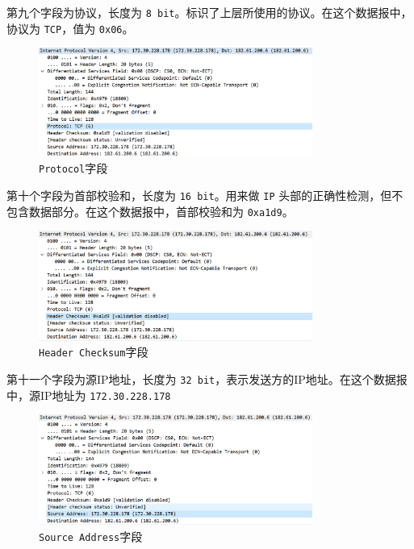 \documentclass{article}
\begin{document}
第九个字段为协议，长度为 \texttt{8 bit}。标识了上层所使用的协议。在这个数据报中，协议为 \texttt{TCP}，值为 \texttt{0x06}。

\begin{figure}[H]
  \centering
  \includegraphics[width=0.8\textwidth]{img/17.png}
  \caption{\texttt{Protocol}字段}
  \label{fig:16}
\end{figure}

第十个字段为首部校验和，长度为 \texttt{16 bit}。用来做 \texttt{IP} 头部的正确性检测，但不包含数据部分。在这个数据报中，首部校验和为 \texttt{0xa1d9}。

\begin{figure}[H]
  \centering
  \includegraphics[width=0.8\textwidth]{img/18.png}
  \caption{\texttt{Header Checksum}字段}
  \label{fig:17}
\end{figure}

第十一个字段为源IP地址，长度为 \texttt{32 bit}，表示发送方的IP地址。在这个数据报中，源IP地址为 \texttt{172.30.228.178}

\begin{figure}[H]
  \centering
  \includegraphics[width=0.8\textwidth]{img/19.png}
  \caption{\texttt{Source Address}字段}
  \label{fig:18}
\end{figure}
\end{document}
